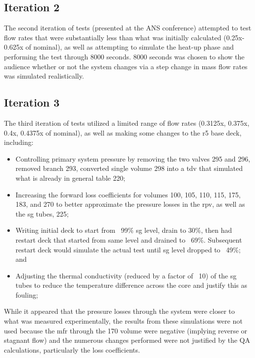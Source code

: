 \documentclass[double,12pt]{beavtex}
\begin{document}
\subsection{Iteration 2}

The second iteration of tests (presented at the ANS conference) attempted to test flow rates that were substantially less than what was initially calculated (0.25x-0.625x of nominal), as well as attempting to simulate the heat-up phase and performing the test through 8000 seconds. 8000 seconds was chosen to show the audience whether or not the system changes via a step change in mass flow rates was simulated realistically. 

\subsection{Iteration 3}

The third iteration of tests utilized a limited range of flow rates (0.3125x, 0.375x, 0.4x, 0.4375x of nominal), as well as making some changes to the \acrshort{r5} base deck, including:
\begin{itemize}
    \item Controlling primary system pressure by removing the two valves 295 and 296, removed branch 293, converted single volume 298 into a \acrshort{tdv} that simulated what is already in general table 220;
    \item Increasing the forward loss coefficients for volumes 100, 105, 110, 115, 175, 183, and 270 to better approximate the pressure losses in the \acrshort{rpv}, as well as the \acrshort{sg} tubes, 225;
    \item Writing initial deck to start from ~99\% \acrshort{sg} level, drain to 30\%, then had restart deck that started from same level and drained to ~69\%. Subsequent restart deck would simulate the actual test until \acrshort{sg} level dropped to ~49\%; and
    \item Adjusting the thermal conductivity (reduced by a factor of ~10) of the \acrshort{sg} tubes to reduce the temperature difference across the core and justify this as fouling;
\end{itemize}

While it appeared that the pressure losses through the system were closer to what was measured experimentally, the results from these simulations were not used because the \acrshort{mfr} through the 170 volume were negative (implying reverse or stagnant flow) and the numerous changes performed were not justified by the QA calculations, particularly the loss coefficients.  
\end{document}
